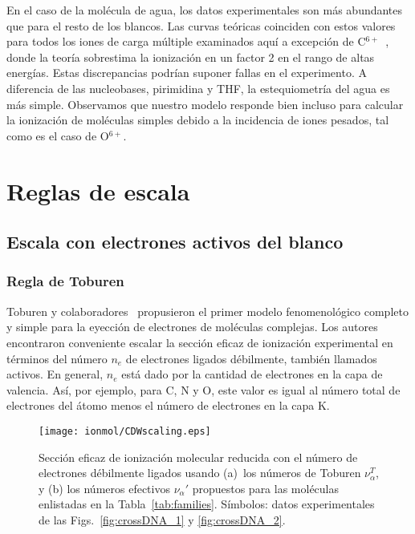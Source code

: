 En el caso de la molécula de agua, los datos experimentales son más 
abundantes que para el resto de los blancos. Las curvas teóricas 
coinciden con estos valores~\cite{Luna2007,Bolorizadeh86,H_Rudd85,
Ohsawa05,He_Rudd85,toburen80,Bhattacharjee:16} para todos los iones de 
carga múltiple examinados aquí a excepción de
C$^{6+}$~\cite{DalCappello:09,Bhattacharjee:17}, donde la teoría 
sobrestima la ionización en un factor 2 en el rango de altas energías. 
Estas discrepancias podrían suponer fallas en el experimento. 
A diferencia de las nucleobases, pirimidina y THF, la estequiometría del 
agua es más simple. Observamos que nuestro modelo responde 
bien incluso para calcular la ionización de moléculas simples debido a 
la incidencia de iones pesados, tal como es el caso de O$^{6+}$.

\section{Reglas de escala}
\label{sec:scaling}

\subsection{Escala con electrones activos del blanco}
\label{subsec:ne_scaling}

\subsubsection{Regla de Toburen}
\label{subsec:toburen}

Toburen y colaboradores~\cite{Toburen:75,Toburen:76} propusieron el 
primer modelo fenomenológico completo y simple para la eyección de 
electrones de moléculas complejas. Los autores encontraron conveniente 
escalar la sección eficaz de ionización experimental en términos del 
número $n_e$ de electrones ligados débilmente, también llamados activos. 
En general, $n_e$ está dado por la cantidad de electrones en la capa de 
valencia. Así, por ejemplo, para C, N y O, este valor es igual al número 
total de electrones del átomo menos el número de electrones en la capa 
K. 

\begin{figure}[t]
\centering
\texttt{[image: ionmol/CDWscaling.eps]}
\caption[Sección eficaz de ionización molecular reducida por $n_e$.]
{Sección eficaz de ionización molecular reducida con el número de 
electrones débilmente ligados usando 
(a)~los números de Toburen $\nu_{\alpha}^T$, y 
(b) los números efectivos $\nu_{\alpha}'$ propuestos para las 
moléculas enlistadas en la Tabla~\ref{tab:families}. 
Símbolos: datos experimentales de las Figs.~\ref{fig:crossDNA_1} y 
\ref{fig:crossDNA_2}.}
\label{fig:newscaling}
\end{figure}

